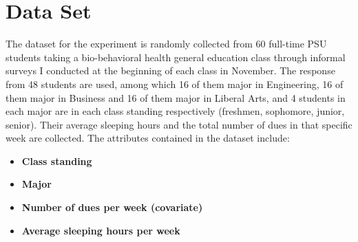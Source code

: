 \documentclass{article} %
\begin{document}
\section{Data Set}
The dataset for the experiment is randomly collected from 60 full-time PSU students taking a bio-behavioral health general education class through informal surveys I conducted at the beginning of each class in November. The response from 48 students are used, among which 16 of them major in Engineering, 16 of them major in Business and 16 of them major in Liberal Arts, and 4  students in each major are in each class standing respectively (freshmen, sophomore, junior, senior). Their average sleeping hours and the total number of dues in that specific week are collected.
The attributes contained in the dataset include:
\begin{itemize}
\item  \textbf{Class standing}
\item  \textbf{Major}
\item  \textbf{Number of dues per week (covariate)}
\item  \textbf{Average sleeping hours per week}
\end{itemize}
\end{document}
